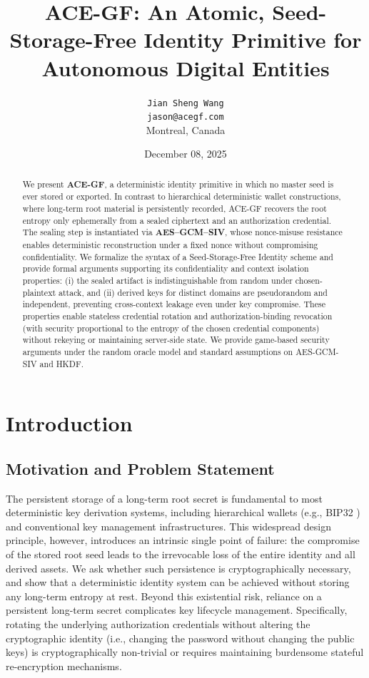 \documentclass[12pt,a4paper]{article}
\title{ACE-GF: An Atomic, Seed-Storage-Free Identity Primitive for Autonomous Digital Entities}
\author{
  \texttt{Jian Sheng Wang} \\
  \texttt{jason@acegf.com} \\
  Montreal, Canada
}
\date{December 08, 2025}
\begin{document}
  \maketitle
  \begin{abstract}
   We present \textbf{ACE-GF}, a deterministic identity primitive in which no master seed is ever stored or exported.
   In contrast to hierarchical deterministic wallet constructions, where long-term root material is persistently recorded, ACE-GF recovers the root entropy only ephemerally from a sealed ciphertext and an authorization credential.
   The sealing step is instantiated via \textbf{AES--GCM--SIV}, whose nonce-misuse resistance enables deterministic reconstruction under a fixed nonce without compromising confidentiality.
   We formalize the syntax of a Seed-Storage-Free Identity scheme and provide formal arguments supporting its confidentiality and context isolation properties:
   (i) the sealed artifact is indistinguishable from random under chosen-plaintext attack, and
   (ii) derived keys for distinct domains are pseudorandom and independent, preventing cross-context leakage even under key compromise.
   These properties enable stateless credential rotation and authorization-binding revocation (with security proportional to the entropy of the chosen credential components) without rekeying or maintaining server-side state. We provide game-based security arguments under the random oracle model and standard assumptions on AES-GCM-SIV and HKDF.
  \end{abstract}

  \clearpage %
  \setcounter{page}{1}  %
  \section{Introduction}

  \subsection{Motivation and Problem Statement}

  The persistent storage of a long-term root secret is fundamental to most deterministic key derivation systems, including hierarchical wallets (e.g., BIP32 \cite{bip32}) and conventional key management infrastructures. This widespread design principle, however, introduces an intrinsic single point of failure: the compromise of the stored root seed leads to the irrevocable loss of the entire identity and all derived assets. We ask whether such persistence is cryptographically necessary, and show that a deterministic identity system can be achieved without storing any long-term entropy at rest. Beyond this existential risk, reliance on a persistent long-term secret complicates key lifecycle management. Specifically, rotating the underlying authorization credentials without altering the cryptographic identity (i.e., changing the password without changing the public keys) is cryptographically non-trivial or requires maintaining burdensome stateful re-encryption mechanisms.
\end{document}

